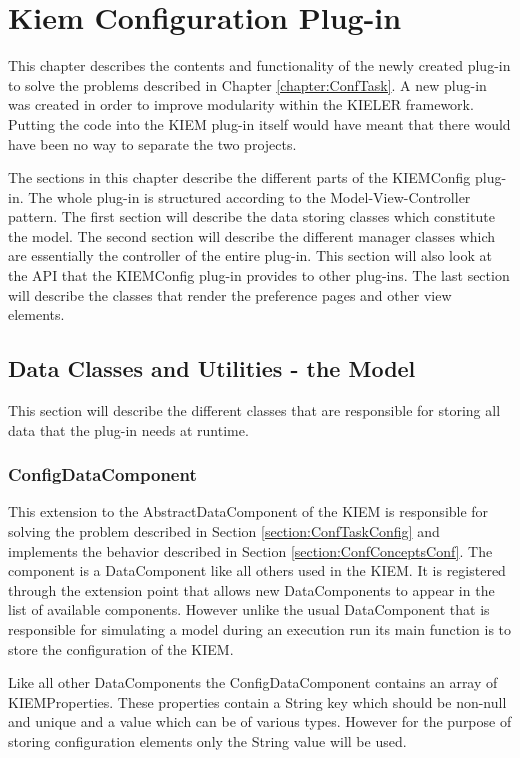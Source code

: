 \chapter{Kiem Configuration Plug-in}
\label{chapter:KiemConfig}
This chapter describes the contents and functionality of the newly created
plug-in to solve the problems described in Chapter \ref{chapter:ConfTask}.
A new plug-in was created in order to improve modularity within the \ac{KIELER} framework.
Putting the code into the \ac{KIEM} plug-in itself would have meant that
there would have been no way to separate the two projects.

The sections in this chapter describe the different parts of the \ac{KIEMConfig} plug-in.
The whole plug-in is structured according to the Model-View-Controller pattern.
The first section will describe the data storing classes which constitute the model.
The second section will describe the different manager classes which are essentially the
controller of the entire plug-in. This section will also look at the \ac{API} that the
\ac{KIEMConfig} plug-in provides to other plug-ins.
The last section will describe the classes that render the preference pages and other
view elements.

\section{Data Classes and Utilities - the Model}
\label{section:ConfModel}
This section will describe the different classes that are responsible for storing all
data that the plug-in needs at runtime.


\subsection{ConfigDataComponent}
\label{section:ConfigDataComponent}
This extension to the AbstractDataComponent of the \ac{KIEM} is responsible for solving
the problem described in Section \ref{section:ConfTaskConfig} and implements the behavior
described in Section \ref{section:ConfConceptsConf}. The component is a DataComponent
like all others used in the \ac{KIEM}. It is registered through the extension point
that allows new DataComponents to appear in the list of available components.
However unlike the usual DataComponent that is responsible for simulating a model during
an execution run its main function is to store the configuration of the \ac{KIEM}.

Like all other DataComponents the ConfigDataComponent contains an array of
KIEMProperties. These properties contain a String key which should be non-null and unique and 
a value which can be of various types. However for the purpose of storing configuration
elements only the String value will be used.


